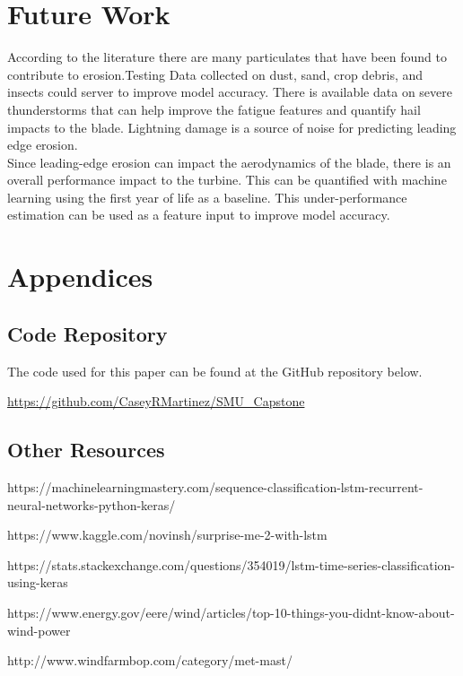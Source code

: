 \documentclass[runningheads]{llncs}
\begin{document}
\section{Future Work}
According to the literature\cite{rain} there are many particulates that have been found to contribute to erosion.Testing \cite{SolarDyn85:online} Data collected on dust, sand, crop debris, and insects could server to improve model accuracy. There is available data on severe thunderstorms\cite{storms} that can help improve the fatigue features and quantify hail impacts to the blade. Lightning damage is a source of noise for predicting leading edge erosion. \\
Since leading-edge erosion can impact the aerodynamics of the blade, there is an overall performance impact to the turbine. This can be quantified with machine learning using the first year of life as a baseline. This under-performance estimation can be used as a feature input to improve model accuracy. 




\section{Appendices} 

\subsection{Code Repository}

The code used for this paper can be found at the GitHub repository below. 

\url{https://github.com/CaseyRMartinez/SMU_Capstone}

\subsection{Other Resources}

https://machinelearningmastery.com/sequence-classification-lstm-recurrent-neural-networks-python-keras/

https://www.kaggle.com/novinsh/surprise-me-2-with-lstm

https://stats.stackexchange.com/questions/354019/lstm-time-series-classification-using-keras

https://www.energy.gov/eere/wind/articles/top-10-things-you-didnt-know-about-wind-power

http://www.windfarmbop.com/category/met-mast/
\end{document}
